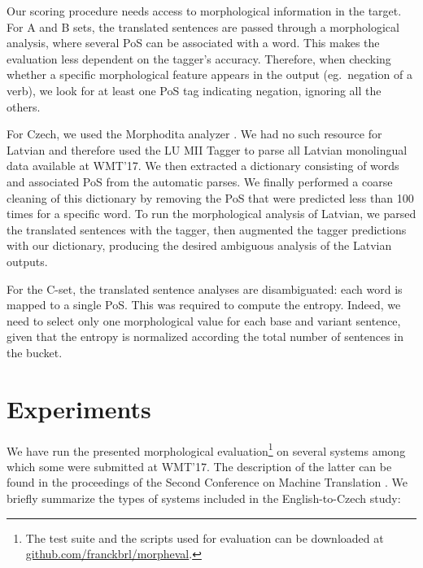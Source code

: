 \documentclass[11pt,letterpaper,final,nohyperref]{article}
\begin{document}
Our scoring procedure needs access to morphological information in the target. For A and B sets, the translated sentences are passed through a morphological analysis, where several PoS can be associated with a word. This makes the evaluation less dependent on the tagger's accuracy. Therefore, when checking whether a specific
morphological feature appears in the output (eg.\ negation of a verb), we look for at least one PoS tag indicating negation, ignoring all the others.

For Czech, we used the Morphodita analyzer \cite{strakova14morphodita}. We had no such resource
for Latvian and therefore used the LU MII Tagger \cite{paikens13lv} to parse all Latvian monolingual data available at WMT'17. We then extracted a dictionary consisting of words and associated PoS from the automatic parses.
We finally performed a coarse cleaning of this dictionary by removing the PoS that were predicted less than 100 times for a specific word. To run the morphological analysis of Latvian, we parsed the translated sentences with the tagger, then augmented the tagger predictions with our dictionary, producing the desired ambiguous analysis
of the Latvian outputs.

For the C-set, the translated sentence analyses are disambiguated: each word is mapped to a single PoS.
This was required to compute the entropy. Indeed, we need to select only one morphological value
for each base and variant sentence, given that the entropy is normalized according the total number of sentences
in the bucket.

\section{Experiments \label{sec:experiments}}

We have run the presented morphological evaluation\footnote{The test suite and the scripts used for evaluation can
be downloaded at \url{github.com/franckbrl/morpheval}.}
on several systems among which some were submitted at WMT'17. The description
of the latter can be found in the proceedings of the Second Conference
on Machine Translation . We briefly summarize
the types of systems included in the English-to-Czech study:
\end{document}

